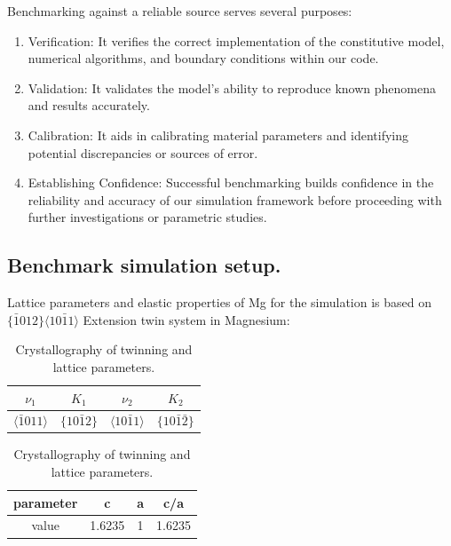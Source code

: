 Benchmarking against a reliable source serves several purposes:

\begin{enumerate}
    \item Verification: It verifies the correct implementation of the constitutive model, numerical algorithms, and boundary conditions within our code.
    \item Validation: It validates the model's ability to reproduce known phenomena and results accurately.
    \item Calibration: It aids in calibrating material parameters and identifying potential discrepancies or sources of error.
    \item Establishing Confidence: Successful benchmarking builds confidence in the reliability and accuracy of our simulation framework before proceeding with further investigations or parametric studies.
\end{enumerate}

\subsection{Benchmark simulation setup.}

Lattice parameters and elastic properties of Mg for the simulation is based on \cite{HULL1922189}  \\ $\{\bar{1} 0 1 2\} \langle 1 0 \bar{1} 1 \rangle$ Extension twin system in Magnesium:

\begin{table}[H]
    \begin{subtable}{0.45\textwidth}
    \centering
    \caption{Crystallography of twinning.}
    \label{tab:Twin_geometry}
        \begin{tabular}{cccc}
        \hline
        $\nu_1$ & $K_1$ & $\nu_2$ & $K_2$ \\
        \hline
        $\langle  \bar{1} 0 1 1 \rangle$ & $\{ 1 0 \bar{1} 2 \}$ & $\langle 1 0 \bar{1} 1 \rangle$ & $\{ 1 0 \bar{1} \bar{2} \}$ \\
        \hline
        \end{tabular}
    \end{subtable}
    \begin{subtable}{0.45\textwidth}
    \centering
    \caption{Lattice parameters.}
    \label{tab:cOverA}
        \begin{tabular}{cccc}
        \hline
        parameter & c & a & c/a \\
        \hline
        value & 1.6235 & 1 & 1.6235 \\
        \hline
        \end{tabular}
    \end{subtable}
    \caption{Crystallography of twinning and lattice parameters.}
    \label{tab:Twin_crystallography}
    
\end{table}



